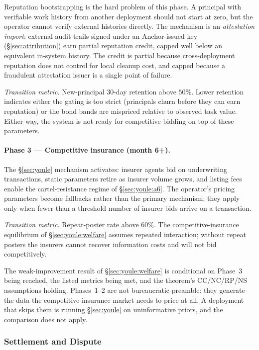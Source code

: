 \documentclass[11pt,a4paper]{article}
\theoremstyle{definition}
\theoremstyle{remark}
\begin{document}
Reputation bootstrapping is the hard problem of this phase. A principal with verifiable work history from another deployment should not start at zero, but the operator cannot verify external histories directly. The mechanism is an \emph{attestation import}: external audit trails signed under an Anchor-issued key (\S\ref{sec:attribution}) earn partial reputation credit, capped well below an equivalent in-system history. The credit is partial because cross-deployment reputation does not control for local cleanup cost, and capped because a fraudulent attestation issuer is a single point of failure.

\emph{Transition metric.} New-principal $30$-day retention above $50\%$. Lower retention indicates either the gating is too strict (principals churn before they can earn reputation) or the bond bands are mispriced relative to observed task value. Either way, the system is not ready for competitive bidding on top of these parameters.

\paragraph{Phase 3 --- Competitive insurance (month 6+).}
The \S\ref{sec:youle} mechanism activates: insurer agents bid on underwriting transactions, static parameters retire as insurer volume grows, and listing fees enable the cartel-resistance regime of \S\ref{sec:youle:a6}. The operator's pricing parameters become fallbacks rather than the primary mechanism; they apply only when fewer than a threshold number of insurer bids arrive on a transaction.

\emph{Transition metric.} Repeat-poster rate above $60\%$. The competitive-insurance equilibrium of \S\ref{sec:youle:welfare} assumes repeated interaction; without repeat posters the insurers cannot recover information costs and will not bid competitively.

\medskip

The weak-improvement result of \S\ref{sec:youle:welfare} is conditional on Phase~3 being reached, the listed metrics being met, and the theorem's CC/NC/RP/NS assumptions holding. Phases~1--2 are not bureaucratic preamble: they generate the data the competitive-insurance market needs to price at all. A deployment that skips them is running \S\ref{sec:youle} on uninformative priors, and the comparison does not apply.

\subsubsection{Settlement and Dispute}\label{sec:pricing:settlement}
\end{document}

